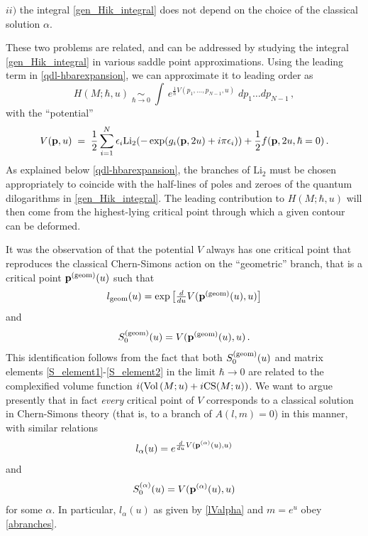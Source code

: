 \documentclass[hyper]{JHEP3}
\newcommand\be{\begin{equation}}
\newcommand\ee{\end{equation}}
\newcommand{\Vol}{{\mbox{Vol\,}}}
\def\={\;=\;}
\def\Li{\text{Li}_2}
\begin{document}
$ii)$ the integral \eqref{gen_Hik_integral} does not depend on the choice
of the classical solution $\alpha$.

\noindent
These two problems are related, and can be addressed by studying
the integral \eqref{gen_Hik_integral} in various saddle point approximations.
Using the leading term in \eqref{qdl-hbarexpansion}, we can approximate it to leading order as
\be
H (M;\hbar, u) \; \underset{\hbar \to 0}{\sim} \;
 \int\,e^{\frac{1}{\hbar} V(p_1, \ldots, p_{N-1}, u)}\; dp_1 \ldots dp_{N-1}\,,
\label{Hik_V_limit}
\ee
with the ``potential''
\be
V({\bf p},u) \= \frac{1}{2} \sum_{i=1}^N \epsilon_i \Li(-\exp(g_i({\bf p},2u) + i\pi \epsilon_i))+\frac{1}{2} f({\bf p},2u,\hbar=0)\,.
\label{Hik_gen_V}
\ee
As explained below \eqref{qdl-hbarexpansion}, the branches of $\Li$ must be chosen appropriately to coincide with the half-lines of poles and zeroes of the quantum dilogarithms in \eqref{gen_Hik_integral}. 
The leading contribution to $H (M;\hbar, u)$ will then come from
the highest-lying critical point through which a given contour can be deformed.

It was the observation of \cite{hikami-2006} that the potential $V$
always has one critical point that reproduces the classical Chern-Simons action
on the ``geometric'' branch,
that is a critical point ${\bf p}^{({\rm geom})} (u)$ such that
\be
l_{{\rm geom}} (u) = \exp \left[ \textstyle \frac{d}{du} V({\bf p}^{({\rm geom})}(u), u) \right]
\label{lVgeom}
\ee
and
\be
S_0^{({\rm geom})} (u) = V({\bf p}^{({\rm geom})} (u), u)\,.
\label{SVgeom}
\ee
This identification follows from the fact that both $S_0^{({\rm geom})} (u)$
and matrix elements \eqref{S_element1}-\eqref{S_element2} in the limit $\hbar \to 0$
are related to the complexified volume function
$i(\Vol (M;u) + i {\rm CS} (M;u))$.
We want to argue presently that in fact {\it every} critical point of $V$
corresponds to a classical solution in Chern-Simons theory
(that is, to a branch of $A(l,m)=0$) in this manner,
with similar relations
\be
l_{\alpha} (u) =  e^{\frac{d}{du} V({\bf p}^{(\alpha)} (u), u)}
\label{lValpha}
\ee
and
\be
S_0^{(\alpha)} (u) = V({\bf p}^{(\alpha)} (u), u)
\label{SValpha}
\ee
for some $\alpha$.
In particular, $l_{\alpha} (u)$ as given by \eqref{lValpha} and $m=e^u$ obey \eqref{abranches}.
\end{document}
